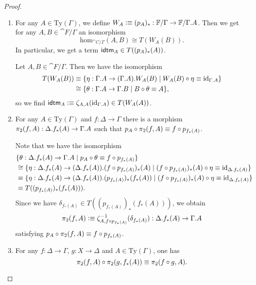 \begin{proof}
\begin{enumerate}
\item
For any $A\in\mathrm{Ty}(\Gamma)$, we define
$W_A\defeq (p_A)_\ast:\cat{F}/\Gamma\to\cat{F}/\ctxext{\Gamma}{A}$. Then we get
for any $A,B\in\cat{F}/\Gamma$ an isomorphism
\begin{equation*}
\mathrm{hom}_{\cat{C}/\Gamma}(A,B)
  \cong
T(W_A(B)).
\end{equation*}
In particular, we get a term $\idtm{A}\in T((p_A)_\ast(A))$. 
\medskip

Let $A,B\in\cat{F}/\Gamma$. Then we have the isomorphism
\begin{align*}
T(W_A(B)) & \jdeq \{\eta:\ctxext{\Gamma}{A}\to\ctxext{{\Gamma}{A}}{W_A(B)}\mid W_A(B)\circ\eta\jdeq\catid{\ctxext{\Gamma}{A}}\} \\
  & \cong
\{\theta:\ctxext{\Gamma}{A}\to\ctxext{\Gamma}{B}\mid B\circ\theta\jdeq A\},
\end{align*}
so we find $\idtm{A}\defeq\zeta_{A,A}(\catid{\ctxext{\Gamma}{A}})\in T(W_A(A))$.

\item For any $A\in\mathrm{Ty}(\Gamma)$ and $f:\Delta\to\Gamma$ 
there is a morphism $\pi_2(f,A):\ctxext{\Delta}{f_\ast(A)}\to\ctxext{\Gamma}{A}$
such that $p_A\circ \pi_2(f,A)\equiv f\circ p_{f_\ast(A)}$.

\medskip
Note that we have the isomorphism
\begin{align*}
& \{ \theta : \ctxext{\Delta}{f_\ast(A)}\to\ctxext{\Gamma}{A}\mid p_A\circ\theta\jdeq f\circ p_{f_\ast(A)} \} \\
  & \cong
\{ \eta : \ctxext{\Delta}{f_\ast(A)}\to\ctxext{{\Delta}{f_\ast(A)}}{(f\circ p_{f_\ast(A)})_\ast(A)}
  \mid (f\circ p_{f_\ast(A)})_\ast(A)\circ\eta\jdeq\catid{\ctxext{\Delta}{f_\ast(A)}}\} \\
  & \jdeq
\{ \eta : \ctxext{\Delta}{f_\ast(A)}\to\ctxext{{\Delta}{f_\ast(A)}}{(p_{f_\ast(A)})_\ast(f_\ast(A))}
  \mid (f\circ p_{f_\ast(A)})_\ast(A)\circ\eta\jdeq\catid{\ctxext{\Delta}{f_\ast(A)}}\} \\
  & \jdeq
T((p_{f_\ast(A)})_\ast(f_\ast(A))).
\end{align*}
Since we have $\delta_{f_\ast(A)}\in T((p_{f_\ast(A)})_\ast(f_\ast(A)))$, we obtain 
\begin{equation*}
\pi_2(f,A)\defeq \zeta_{A,f\circ p_{f_\ast(A)}}^{-1}(\delta_{f_\ast(A)}):\ctxext{\Delta}{f_\ast(A)}\to\ctxext{\Gamma}{A}
\end{equation*}
satisfying $p_A\circ\pi_2(f,A)\equiv f\circ p_{f_\ast(A)}$.
\item For any $f:\Delta\to\Gamma$, $g:X\to\Delta$ and $A\in\mathrm{Ty}(\Gamma)$, one has
\begin{equation*}
\pi_2(f,A)\circ\pi_2(g,f_\ast(A))\equiv\pi_2(f\circ g,A).
\end{equation*}


\end{enumerate}
\end{proof}
